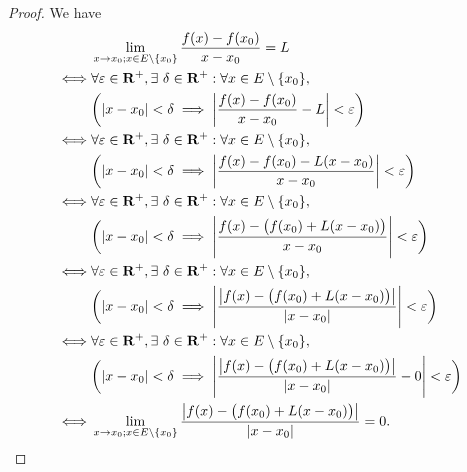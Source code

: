 \begin{proof}
    We have
    \begin{align*}
             & \lim_{x \to x_0 ; x \in E \setminus \{x_0\}} \frac{f(x) - f(x_0)}{x - x_0} = L                                                       \\
        \iff & \forall \varepsilon \in \R^+, \exists\ \delta \in \R^+ : \forall x \in E \setminus \{x_0\},                                          \\
             & \bigg(\abs{x - x_0} < \delta \implies \abs{\frac{f(x) - f(x_0)}{x - x_0} - L} < \varepsilon\bigg)                                    \\
        \iff & \forall \varepsilon \in \R^+, \exists\ \delta \in \R^+ : \forall x \in E \setminus \{x_0\},                                          \\
             & \bigg(\abs{x - x_0} < \delta \implies \abs{\frac{f(x) - f(x_0) - L(x - x_0)}{x - x_0}} < \varepsilon\bigg)                           \\
        \iff & \forall \varepsilon \in \R^+, \exists\ \delta \in \R^+ : \forall x \in E \setminus \{x_0\},                                          \\
             & \bigg(\abs{x - x_0} < \delta \implies \abs{\frac{f(x) - \big(f(x_0) + L(x - x_0)\big)}{x - x_0}} < \varepsilon\bigg)                 \\
        \iff & \forall \varepsilon \in \R^+, \exists\ \delta \in \R^+ : \forall x \in E \setminus \{x_0\},                                          \\
             & \bigg(\abs{x - x_0} < \delta \implies \abs{\frac{\abs{f(x) - \big(f(x_0) + L(x - x_0)\big)}}{\abs{x - x_0}}} < \varepsilon\bigg)     \\
        \iff & \forall \varepsilon \in \R^+, \exists\ \delta \in \R^+ : \forall x \in E \setminus \{x_0\},                                          \\
             & \bigg(\abs{x - x_0} < \delta \implies \abs{\frac{\abs{f(x) - \big(f(x_0) + L(x - x_0)\big)}}{\abs{x - x_0}} - 0} < \varepsilon\bigg) \\
        \iff & \lim_{x \to x_0 ; x \in E \setminus \{x_0\}} \frac{\abs{f(x) - \big(f(x_0) + L(x - x_0)\big)}}{\abs{x - x_0}} = 0.
    \end{align*}
\end{proof}

